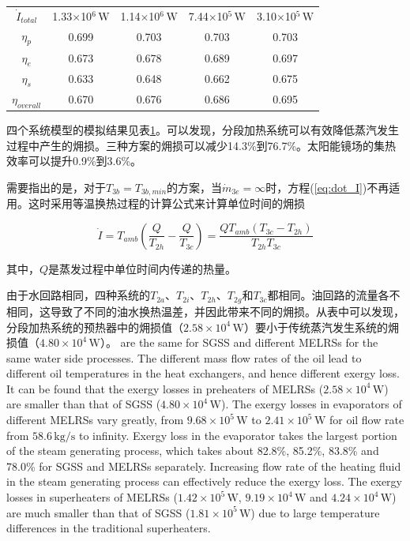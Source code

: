 \begin{table}[htbp]
\begin{center}
\begin{tabular}{ccccc}
		$\dot{I}_{total}$    &    1.33$\times$10$^6\,\mathrm{W}$    &  1.14$\times$10$^6\,\mathrm{W}$  &	7.44$\times$10$^5\,\mathrm{W}$	&	3.10$\times$10$^5\,\mathrm{W}$\\
		$\eta_p$    &    0.699    &	0.703	&    0.703	&	0.703\\
		$\eta_e$    &    0.673    &	0.678	& 0.689	&	0.697\\
		$\eta_s$    &    0.633    &  0.648	&  0.662	&	0.675\\
		$\eta_{overall}$    &    0.670   &	0.676	&    0.686	&	0.695\\
		\bottomrule
	\end{tabular}
	\end{center}
	\label{tab:comparison}
\end{table}

四个系统模型的模拟结果见表\ref{tab:comparison}。可以发现，分段加热系统可以有效降低蒸汽发生过程中产生的㶲损。三种方案的㶲损可以减少14.3\%到76.7\%。太阳能镜场的集热效率可以提升0.9\%到3.6\%。

需要指出的是，对于$T_{3b} = T_{3b,min}$的方案，当$\dot{m}_{3e} = \infty$时，方程(\ref{eq:dot_I})不再适用。这时采用等温换热过程的计算公式来计算单位时间的㶲损

\begin{equation}
  \dot{I} = T_{amb} (\frac{Q}{T_{2h}} - \frac{Q}{T_{3c}}) = \frac{QT_{amb}(T_{3c} - T_{2h})}{T_{2h}T_{3c}}
  \label{eq:isothermal}
\end{equation}

其中，$Q$是蒸发过程中单位时间内传递的热量。

由于水回路相同，四种系统的$T_{2a}$、$T_{2i}$、$T_{2h}$、$T_{2g}$和$T_{3c}$都相同。油回路的流量各不相同，这导致了不同的油水换热温差，并因此带来不同的㶲损。从表中可以发现，分段加热系统的预热器中的㶲损值（$2.58\times 10^4\,\mathrm{W}$）要小于传统蒸汽发生系统的㶲损值（$4.80\times10^4\,\mathrm{W}$）。
are the same for SGSS and different MELRSs for the same water side processes. The different mass flow rates of the oil lead to different oil temperatures in the heat exchangers, and hence different exergy loss. It can be found that the exergy losses in preheaters of MELRSs ($2.58\times 10^4\,\mathrm{W}$) are smaller than that of SGSS ($4.80\times10^4\,\mathrm{W}$). The exergy losses in evaporators of different MELRSs vary greatly, from $9.68\times10^5\,\mathrm{W}$ to $2.41\times10^5\,\mathrm{W}$ for oil flow rate from $58.6\,\mathrm{kg/s}$ to infinity.
Exergy loss in the evaporator takes the largest portion of the steam generating process, which takes about 82.8\%, 85.2\%, 83.8\% and 78.0\% for SGSS and MELRSs separately.
Increasing flow rate of the heating fluid in the steam generating process can effectively reduce the exergy loss.
The exergy losses in superheaters of MELRSs ($1.42\times 10^5\,\mathrm{W}$, $9.19\times 10^4\,\mathrm{W}$ and $4.24\times 10^4\,\mathrm{W}$) are much smaller than that of SGSS ($1.81\times10^5\,\mathrm{W}$) due to large temperature differences in the traditional superheaters.

